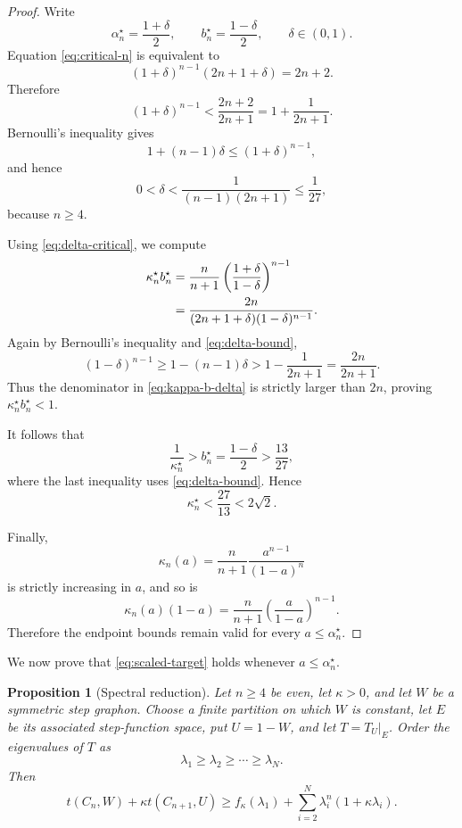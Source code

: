 \documentclass[11pt]{article}
\newtheorem{proposition}[theorem]{Proposition}
\theoremstyle{definition}
\theoremstyle{remark}
\begin{document}
\begin{proof}
  Write
  \[
    \alpha_n^\star=\frac{1+\delta}{2},
    \qquad
    b_n^\star=\frac{1-\delta}{2},
    \qquad
    \delta\in(0,1).
  \]
  Equation \eqref{eq:critical-n} is equivalent to
  \begin{equation}
    (1+\delta)^{n-1}(2n+1+\delta)=2n+2.
    \label{eq:delta-critical}
  \end{equation}
  Therefore
  \[
    (1+\delta)^{n-1}
    <\frac{2n+2}{2n+1}
    =1+\frac{1}{2n+1}.
  \]
  Bernoulli's inequality gives
  \[
    1+(n-1)\delta
    \le(1+\delta)^{n-1},
  \]
  and hence
  \begin{equation}
    0<\delta<\frac{1}{(n-1)(2n+1)}\le\frac1{27},
    \label{eq:delta-bound}
  \end{equation}
  because $n\ge4$.

  Using \eqref{eq:delta-critical}, we compute
  \begin{align}
    \kappa_n^\star b_n^\star
    &=
    \frac{n}{n+1}
    \left(\frac{1+\delta}{1-\delta}\right)^{n-1}
    \notag\\
    &=
    \frac{2n}{(2n+1+\delta)(1-\delta)^{n-1}}.
    \label{eq:kappa-b-delta}
  \end{align}
  Again by Bernoulli's inequality and \eqref{eq:delta-bound},
  \[
    (1-\delta)^{n-1}
    \ge1-(n-1)\delta
    >1-\frac1{2n+1}
    =\frac{2n}{2n+1}.
  \]
  Thus the denominator in \eqref{eq:kappa-b-delta} is strictly larger than
  $2n$, proving $\kappa_n^\star b_n^\star<1$.

  It follows that
  \[
    \frac1{\kappa_n^\star}>b_n^\star
    =\frac{1-\delta}{2}
    >\frac{13}{27},
  \]
  where the last inequality uses \eqref{eq:delta-bound}.  Hence
  \[
    \kappa_n^\star<\frac{27}{13}<2\sqrt2.
  \]

  Finally,
  \[
    \kappa_n(a)
    =\frac{n}{n+1}\frac{a^{n-1}}{(1-a)^n}
  \]
  is strictly increasing in $a$, and so is
  \[
    \kappa_n(a)(1-a)
    =\frac{n}{n+1}
    \left(\frac{a}{1-a}\right)^{n-1}.
  \]
  Therefore the endpoint bounds remain valid for every $a\le\alpha_n^\star$.
\end{proof}

We now prove that \eqref{eq:scaled-target} holds whenever
$a\le\alpha_n^\star$.

\begin{proposition}[Spectral reduction]
  \label{prop:spectral-reduction}
  Let $n\ge4$ be even, let $\kappa>0$, and let $W$ be a symmetric step
  graphon.  Choose a finite partition on which $W$ is constant, let $E$ be its
  associated step-function space, put $U=1-W$, and let $T=T_U|_E$.  Order the
  eigenvalues of $T$ as
  \[
    \lambda_1\ge\lambda_2\ge\cdots\ge\lambda_N.
  \]
  Then
  \begin{equation}
    t(C_n,W)+\kappa t(C_{n+1},U)
    \ge
    f_\kappa(\lambda_1)
    +
    \sum_{i=2}^N\lambda_i^n(1+\kappa\lambda_i).
    \label{eq:master-spectral}
  \end{equation}
\end{proposition}
\end{document}
